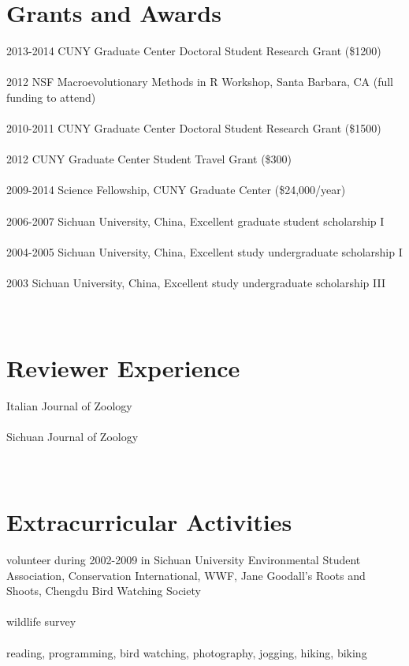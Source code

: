 \documentclass[12pt]{article}
\begin{document}
\section{Grants and Awards}
2013-2014 CUNY Graduate Center Doctoral Student Research Grant (\$1200)\\
\\[-0.30\baselineskip]%
2012 NSF Macroevolutionary Methods in R Workshop, Santa Barbara, CA (full funding to attend)\\
\\[-0.30\baselineskip]%
2010-2011 CUNY Graduate Center Doctoral Student Research Grant (\$1500)\\
\\[-0.30\baselineskip]%
2012 CUNY Graduate Center Student Travel Grant (\$300)\\
\\[-0.30\baselineskip]%
2009-2014 Science Fellowship, CUNY Graduate Center (\$24,000/year)\\
\\[-0.30\baselineskip]%
2006-2007 Sichuan University, China, Excellent graduate student scholarship I\\
\\[-0.30\baselineskip]%
2004-2005  Sichuan University, China, Excellent study undergraduate scholarship I\\
\\[-0.30\baselineskip]%
2003 Sichuan University, China, Excellent study undergraduate scholarship III\\
\\[-0.30\baselineskip]%
\\

\section{Reviewer Experience}
Italian Journal of Zoology\\
\\[-0.30\baselineskip]%
Sichuan Journal of Zoology\\
\\[-0.30\baselineskip]%
\\

\section{Extracurricular Activities}
volunteer during 2002-2009 in Sichuan University Environmental Student Association, Conservation International, WWF, Jane Goodall's Roots and Shoots, Chengdu Bird Watching Society\\
\\[-0.30\baselineskip]%
wildlife survey\\
\\[-0.30\baselineskip]%
reading, programming, bird watching, photography, jogging, hiking, biking
 
 
\end{document}
